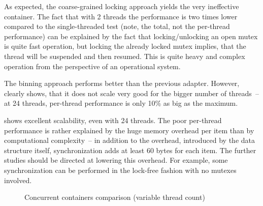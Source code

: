 As expected, the coarse-grained locking approach yields the very ineffective container. The fact that with 2 threads the performance is two times lower compared to the single-threaded test (note, the total, not the per-thread performance) can be explained by the fact that locking/unlocking an open mutex is quite fast operation, but locking the already locked mutex implies, that the thread will be suspended and then resumed. This is quite heavy and complex operation from the perspective of an operational system.

The binning approach performs better than the previous adapter. However,  clearly shows, that it does not scale very good for the bigger number of threads~-- at 24 threads, per-thread performance is only 10\% as big as the maximum.

\cndcname shows excellent scalability, even with 24 threads. The poor per-thread performance is rather explained by the huge memory overhead per item than by computational complexity~-- in addition to the overhead, introduced by the data structure itself, synchronization adds at least 60 bytes for each item. The further studies should be directed at lowering this overhead. For example, some synchronization can be performed in the lock-free fashion with no mutexes involved.

\begin{figure}
\centering
    \label{f4}
\caption{Concurrent containers comparison (variable thread count)}
\end{figure}

